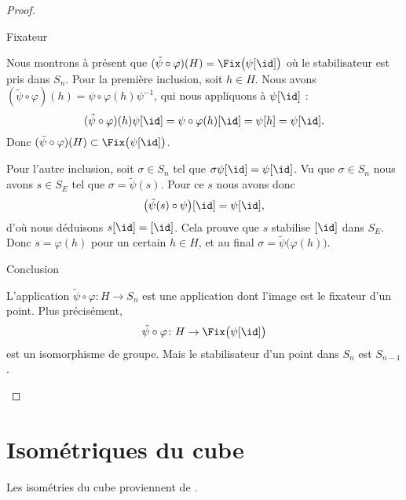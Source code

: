 \begin{proof}
\begin{subproof}
\begin{subproof}
                \item[Fixateur]

                    Nous montrons à présent que \( (\tilde \psi\circ\varphi)(H)=\Fix\big( \psi[\id] \big)\) où le stabilisateur est pris dans \( S_n\). Pour la première inclusion, soit \( h\in H\). Nous avons \( (\tilde \psi\circ\varphi)(h)=\psi\circ\varphi(h)\psi^{-1}\), qui nous appliquons à \( \psi[\id]\) :
                    \begin{equation}
                        (\tilde \psi\circ\varphi)(h)\psi[\id]=\psi\circ\varphi(h)[\id]=\psi[h]=\psi[\id].
                    \end{equation}
                    Donc \( (\tilde \psi\circ\varphi)(H)\subset\Fix\big( \psi[\id] \big)\).

                    Pour l'autre inclusion, soit \( \sigma\in S_n\) tel que \( \sigma\psi[\id]=\psi[\id]\). Vu que \( \sigma\in S_n\) nous avons \( s\in S_E\) tel que \( \sigma=\tilde \psi(s)\). Pour ce \( s\) nous avons donc
                    \begin{equation}
                        \big( \tilde \psi(s)\circ\psi \big)[\id]=\psi[\id],
                    \end{equation}
                    d'où nous déduisons \( s[\id]=[\id]\). Cela prouve que \( s\) stabilise \( [\id]\) dans \( S_E\). Donc \( s=\varphi(h)\) pour un certain \( h\in H\), et au final \( \sigma=\tilde \psi\big( \varphi(h) \big)\).

                \item[Conclusion]

                    L'application \( \tilde \psi\circ\varphi\colon H\to S_n\) est une application dont l'image est le fixateur d'un point. Plus précisément,
                    \begin{equation}
                        \tilde \psi\circ\varphi\colon H\to \Fix\big( \psi[\id] \big)
                    \end{equation}
                    est un isomorphisme de groupe. Mais le stabilisateur d'un point dans \( S_n\) est \( S_{n-1}\).
            \end{subproof}
    \end{subproof}
\end{proof}


\section{Isométriques du cube}
\label{SecPVCmkxM}
Les isométries du cube proviennent de \cite{KXjFWKA}.

